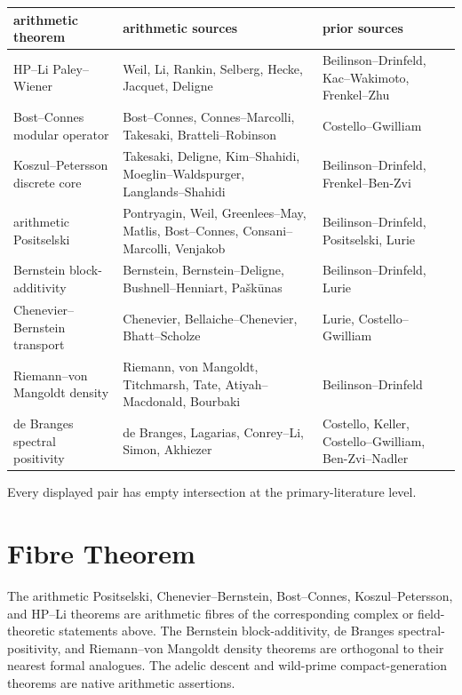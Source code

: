 \begin{center}
\tiny
\begin{tabular}{p{}|p{}|p{}}
arithmetic theorem & arithmetic sources & prior sources \\
\hline
HP--Li Paley--Wiener &
Weil, Li, Rankin, Selberg, Hecke, Jacquet, Deligne &
Beilinson--Drinfeld, Kac--Wakimoto, Frenkel--Zhu \\
Bost--Connes modular operator &
Bost--Connes, Connes--Marcolli, Takesaki, Bratteli--Robinson &
Costello--Gwilliam \\
Koszul--Petersson discrete core &
Takesaki, Deligne, Kim--Shahidi, Moeglin--Waldspurger,
Langlands--Shahidi &
Beilinson--Drinfeld, Frenkel--Ben-Zvi \\
arithmetic Positselski &
Pontryagin, Weil, Greenlees--May, Matlis, Bost--Connes,
Consani--Marcolli, Venjakob &
Beilinson--Drinfeld, Positselski, Lurie \\
Bernstein block-additivity &
Bernstein, Bernstein--Deligne, Bushnell--Henniart, Pa{\v s}k{\=u}nas &
Beilinson--Drinfeld, Lurie \\
Chenevier--Bernstein transport &
Chenevier, Bellaiche--Chenevier, Bhatt--Scholze &
Lurie, Costello--Gwilliam \\
Riemann--von Mangoldt density &
Riemann, von Mangoldt, Titchmarsh, Tate, Atiyah--Macdonald, Bourbaki &
Beilinson--Drinfeld \\
de Branges spectral positivity &
de Branges, Lagarias, Conrey--Li, Simon, Akhiezer &
Costello, Keller, Costello--Gwilliam, Ben-Zvi--Nadler
\end{tabular}
\end{center}

Every displayed pair has empty intersection at the primary-literature
level.

\section{Fibre Theorem}
\label{v4-arith:w6-i:comparison}
\label{v4-arith:w6-i:extent-update}

\begin{theorem}
\label{v4-arith:w6-i:summary}
The arithmetic Positselski, Chenevier--Bernstein, Bost--Connes,
Koszul--Petersson, and HP--Li theorems are arithmetic fibres of the
corresponding complex or field-theoretic statements above.  The
Bernstein block-additivity, de Branges spectral-positivity, and
Riemann--von Mangoldt density theorems are orthogonal to their nearest
formal analogues.  The adelic descent and wild-prime compact-generation
theorems are native arithmetic assertions.
\end{theorem}

